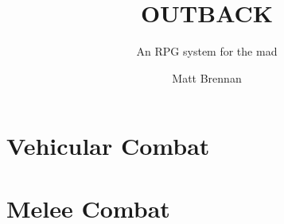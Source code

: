 \documentclass[10pt, a4paper, twocolumn]{book}
\title{\uppercase{Outback}}
\subtitle{An RPG system for the mad}
\author{Matt Brennan}
\date{}
\begin{document}
\frontmatter
\maketitle
\tableofcontents

\mainmatter
\chapter{}
\chapter{Vehicular Combat}
\chapter{Melee Combat}
\end{document}
